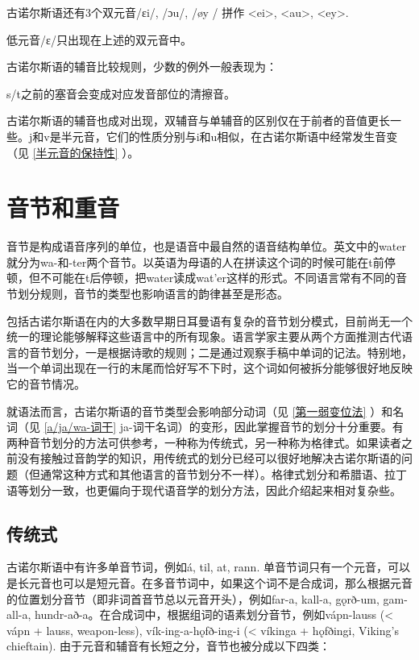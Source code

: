 古诺尔斯语还有3个双元音/ɛi/, /ɔu/, /øy / 拼作 <ei>, <au>, <ey>.

低元音/ɛ/只出现在上述的双元音中。

古诺尔斯语的辅音比较规则，少数的例外一般表现为：

\begin{info}
  s/t之前的塞音会变成对应发音部位的清擦音。\footnotemark
\end{info}

古诺尔斯语的辅音也成对出现，双辅音与单辅音的区别仅在于前者的音值更长一些。j和v是半元音，它们的性质分别与i和u相似，在古诺尔斯语中经常发生音变（见 \ref{半元音的保持性} ）。

\section{音节和重音}
\label{sec:accent}

音节是构成语音序列的单位，也是语音中最自然的语音结构单位。英文中的water就分为wa-和-ter两个音节。以英语为母语的人在拼读这个词的时候可能在t前停顿，但不可能在t后停顿，把water读成wat'er这样的形式。不同语言常有不同的音节划分规则，音节的类型也影响语言的韵律甚至是形态。

包括古诺尔斯语在内的大多数早期日耳曼语有复杂的音节划分模式，目前尚无一个统一的理论能够解释这些语言中的所有现象。语言学家主要从两个方面推测古代语言的音节划分，一是根据诗歌的规则；二是通过观察手稿中单词的记法。特别地，当一个单词出现在一行的末尾而恰好写不下时，这个词如何被拆分能够很好地反映它的音节情况。

就语法而言，古诺尔斯语的音节类型会影响部分动词（见 \ref{第一弱变位法} ）和名词（见 \ref{a/ja/wa-词干} ja-词干名词）的变形，因此掌握音节的划分十分重要。有两种音节划分的方法可供参考，一种称为传统式，另一种称为格律式。如果读者之前没有接触过音韵学的知识，用传统式的划分已经可以很好地解决古诺尔斯语的问题（但通常这种方式和其他语言的音节划分不一样）。格律式划分和希腊语、拉丁语等划分一致，也更偏向于现代语音学的划分方法，因此介绍起来相对复杂些。

\subsection{传统式}

古诺尔斯语中有许多单音节词，例如á, til, at, rann. 单音节词只有一个元音，可以是长元音也可以是短元音。在多音节词中，如果这个词不是合成词，那么根据元音的位置划分音节（即非词首音节总以元音开头），例如far-a, kall-a, gǫrð-um, gam-all-a, hundr-að-a。在合成词中，根据组词的语素划分音节，例如vápn-lauss (< vápn + lauss, weapon-less), vík-ing-a-hǫfð-ing-i (< víkinga + hǫfðingi, Viking's chieftain). 由于元音和辅音有长短之分，音节也被分成以下四类：

